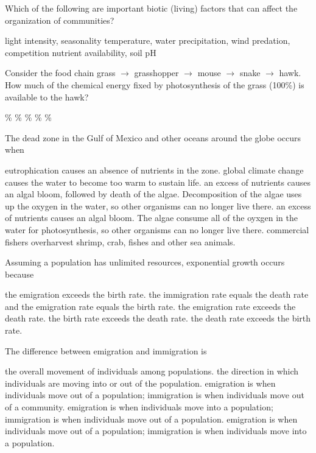 \question
Which of the following are important biotic (living) factors that can affect the  organization of communities?

\begin{choices}
\choice light intensity, seasonality
\choice temperature, water
\choice precipitation, wind
\correctchoice predation, competition
\choice nutrient availability, soil pH
\end{choices}

\question
Consider the food chain grass $\to$ grasshopper $\to$ mouse $\to$ snake $\to$ hawk. How much of the chemical energy fixed by photosynthesis of the grass (100\%) is available to the hawk?

\begin{choices}
\%
\%
\%
\%
\%
\end{choices}

\newpage

\question
The dead zone in the Gulf of Mexico and other oceans around the globe occurs when

\begin{choices}
\choice eutrophication causes an absence of nutrients in the zone.
\choice global climate change causes the water to become too warm to sustain life.
\correctchoice an excess of nutrients causes an algal bloom, followed by death of the algae. Decomposition of the algae uses up the oxygen in the water, so other organisms can no longer live there.
\choice an excess of nutrients causes an algal bloom. The algae consume all of the oyxgen in the water for photosynthesis, so other organisms can no longer live there.
\choice commercial fishers overharvest shrimp, crab, fishes and other sea animals.
\end{choices}

\question
Assuming a population has unlimited resources, exponential growth occurs because

\begin{choices}
\choice the emigration exceeds the birth rate.
\choice the immigration rate equals the death rate and the emigration rate equals the birth rate.
\choice the emigration rate exceeds the death rate.
\correctchoice the birth rate exceeds the death rate.
\choice the death rate exceeds the birth rate.
\end{choices}

\question
The difference between emigration and immigration is

\begin{choices}
\choice the overall movement of individuals among populations.
\choice the direction in which individuals are moving into or out of the population.
\choice emigration is when individuals move out of a population; immigration is when individuals move out of a community.
\choice emigration is when individuals move into a population; immigration is when individuals move out of a population.
\correctchoice emigration is when individuals move out of a population; immigration is when individuals move into a population.
\end{choices}

